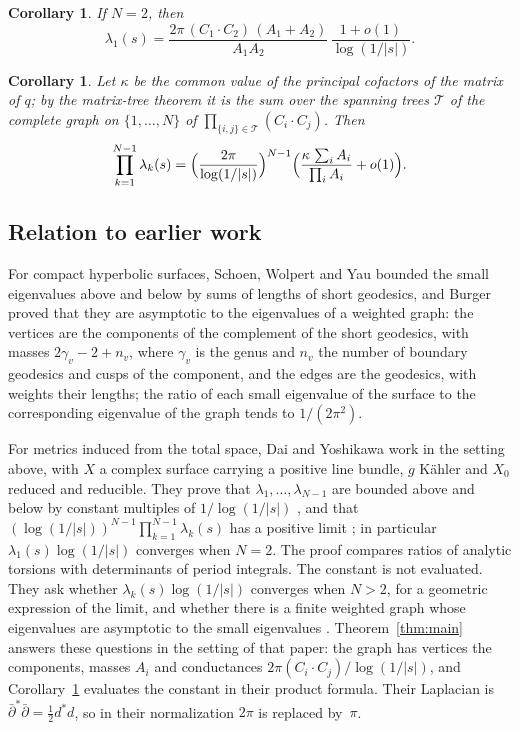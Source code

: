 \documentclass[11pt]{amsart}
\newtheorem{corollary}[theorem]{Corollary}
\theoremstyle{definition}
\theoremstyle{remark}
\begin{document}
\begin{corollary}\label{cor:two}
If $N=2$, then
\[
 \lambda_1(s)=\frac{2\pi\,(C_1\cdot C_2)\,(A_1+A_2)}{A_1A_2}\,
 \frac{1+o(1)}{\log(1/|s|)} .
\]
\end{corollary}

\begin{corollary}\label{cor:product}
Let $\kappa$ be the common value of the principal cofactors of the matrix
of $q$; by the matrix-tree theorem \cite{chaiken} it is the sum over the spanning trees
$\mathcal T$ of the complete graph on $\{1,\ldots,N\}$ of
$\prod_{\{i,j\}\in\mathcal T}(C_i\cdot C_j)$. Then
\[
 \prod_{k=1}^{N-1}\lambda_k(s)
 =\Bigl(\frac{2\pi}{\log(1/|s|)}\Bigr)^{N-1}
 \Bigl(\frac{\kappa\,\sum_iA_i}{\prod_iA_i}+o(1)\Bigr).
\]
\end{corollary}

\subsection{Relation to earlier work}
For compact hyperbolic surfaces, Schoen, Wolpert and Yau \cite{swy}
bounded the small eigenvalues above and below by sums of lengths of short
geodesics, and Burger \cite[Theorem~1.1]{burger} proved that they are
asymptotic to the eigenvalues of a weighted graph: the vertices are the
components of the complement of the short geodesics, with masses
$2\gamma_v-2+n_v$, where $\gamma_v$ is the genus and $n_v$ the number of
boundary geodesics and cusps of the component, and the edges are the
geodesics, with weights their lengths; the ratio of each small eigenvalue
of the surface to the corresponding eigenvalue of the graph tends to
$1/(2\pi^2)$.

For metrics induced from the total space, Dai and Yoshikawa
\cite{dai-yoshikawa} work in the setting above, with $X$ a complex
surface carrying a positive line bundle, $g$ K\"ahler and $X_0$ reduced
and reducible. They prove that
$\lambda_1,\ldots,\lambda_{N-1}$ are bounded above and below by constant
multiples of $1/\log(1/|s|)$ \cite[Theorem~0.2]{dai-yoshikawa}, and that
$(\log(1/|s|))^{N-1}\prod_{k=1}^{N-1}\lambda_k(s)$ has a positive limit
\cite[Theorem~0.3]{dai-yoshikawa}; in particular
$\lambda_1(s)\log(1/|s|)$ converges when $N=2$. The proof compares ratios of analytic torsions with determinants of period
integrals. The constant is not evaluated. They ask whether
$\lambda_k(s)\log(1/|s|)$ converges when $N>2$, for a geometric expression
of the limit, and whether there is a finite weighted graph whose
eigenvalues are asymptotic to the small eigenvalues
\cite[Problems~9.2 and~9.4]{dai-yoshikawa}. Theorem~\ref{thm:main}
answers these questions in the setting of that paper: the graph has
vertices the components, masses $A_i$ and conductances
$2\pi(C_i\cdot C_j)/\log(1/|s|)$, and Corollary~\ref{cor:product}
evaluates the constant in their product formula. Their Laplacian is
$\bar\partial^*\bar\partial=\tfrac12d^*d$, so in their normalization
$2\pi$ is replaced by~$\pi$.
\end{document}

